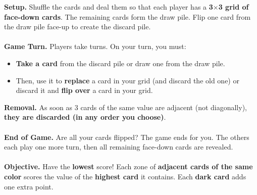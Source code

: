 \documentclass[a4paper]{memoir}
\begin{document}
{\footnotesize

\noindent
\textbf{ Setup.} Shuffle the cards and deal them so that each player has a \textbf{3$\times$3 grid of face-down cards}. 
The remaining cards form the draw pile. Flip one card from the draw pile face-up to create the discard pile.
\\
\\
\textbf{ Game Turn.} Players take turns. On your turn, you must:
\begin{itemize}
    \item \textbf{Take a card} from the discard pile or draw one from the draw pile.
    \item Then, use it to \textbf{replace} a card in your grid (and discard the old one) or discard it and \textbf{flip over} a card in your grid.
\end{itemize}
\textbf{ Removal.} As soon as 3 cards of the same value are adjacent (not diagonally), \textbf{they are discarded (in any order you choose)}.
\\
\\
\textbf{ End of Game.} Are all your cards flipped? The game ends for you. 
The others each play one more turn, then all remaining face-down cards are revealed.
\\
\\
\textbf{ Objective.} Have the \textbf{lowest} score! 
Each zone of \textbf{adjacent cards of the same color} scores the value of the \textbf{highest card} it contains.
Each \textbf{dark card} adds one extra point.
}
\end{document}
